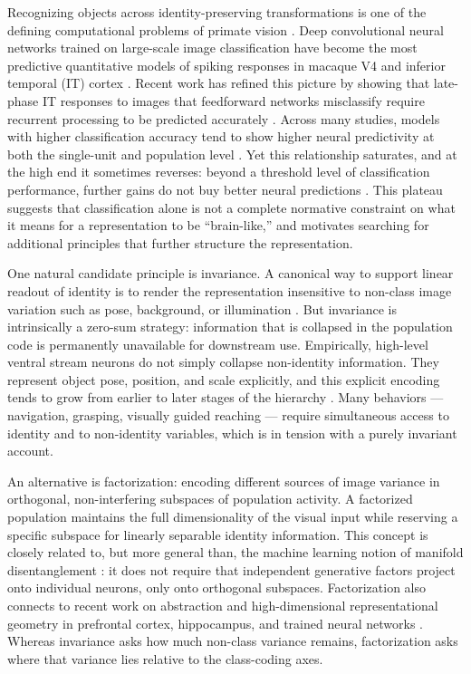 \documentclass[11pt]{article}
\begin{document}
Recognizing objects across identity-preserving transformations is one of the
defining computational problems of primate vision \citep{dicarlo2007untangling,
dicarlo2012how}. Deep convolutional neural networks trained on large-scale
image classification have become the most predictive quantitative models of
spiking responses in macaque V4 and inferior temporal (IT) cortex
\citep{yamins2014performance, khalighrazavi2014deep, yamins2016using}.
Recent work has refined this picture by showing that late-phase IT responses
to images that feedforward networks misclassify require recurrent processing
to be predicted accurately \citep{kar2019evidence}. Across many studies,
models with higher classification accuracy tend to show higher neural
predictivity at both the single-unit and population level
\citep{majaj2015simple, schrimpf2020integrative}. Yet this relationship
saturates, and at the high end it sometimes reverses: beyond a threshold
level of classification performance, further gains do not buy better neural
predictions \citep{schrimpf2020integrative}. This plateau suggests that
classification alone is not a complete normative constraint on what it means
for a representation to be ``brain-like,'' and motivates searching for
additional principles that further structure the representation.

One natural candidate principle is invariance. A canonical way to support
linear readout of identity is to render the representation insensitive to
non-class image variation such as pose, background, or illumination
\citep{dicarlo2007untangling}. But invariance is intrinsically a zero-sum
strategy: information that is collapsed in the population code is
permanently unavailable for downstream use. Empirically, high-level ventral
stream neurons do not simply collapse non-identity information. They
represent object pose, position, and scale explicitly, and this explicit
encoding tends to grow from earlier to later stages of the hierarchy
\citep{hong2016explicit, rust2012balanced, freiwald2010functional}. Many
behaviors --- navigation, grasping, visually guided reaching --- require
simultaneous access to identity and to non-identity variables, which is in
tension with a purely invariant account.

An alternative is factorization: encoding different sources of image variance
in orthogonal, non-interfering subspaces of population activity. A factorized
population maintains the full dimensionality of the visual input while
reserving a specific subspace for linearly separable identity information.
This concept is closely related to, but more general than, the machine
learning notion of manifold disentanglement \citep{higgins2017beta}: it does
not require that independent generative factors project onto individual
neurons, only onto orthogonal subspaces. Factorization also connects to
recent work on abstraction and high-dimensional representational geometry in
prefrontal cortex, hippocampus, and trained neural networks
\citep{bernardi2020geometry, rigotti2013importance, fusi2016why,
stringer2019high, sorscher2022neural}. Whereas invariance asks how much
non-class variance remains, factorization asks where that variance lies
relative to the class-coding axes.
\end{document}
